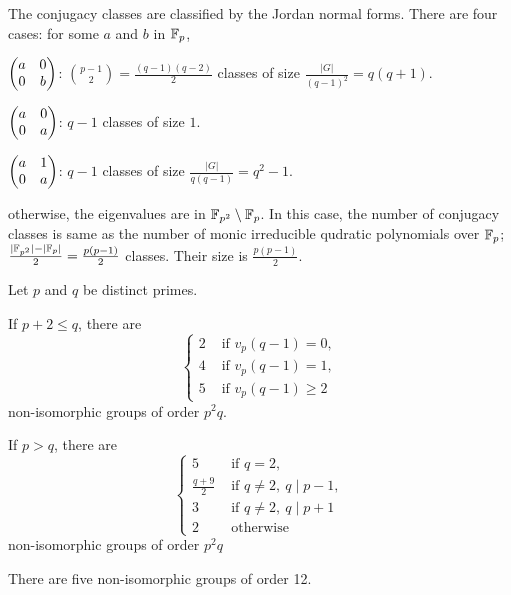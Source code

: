 \documentclass{../note}
\begin{document}
\begin{prb}
The conjugacy classes are classified by the Jordan normal forms.
There are four cases: for some $a$ and $b$ in $\mathbb{F}_p$,
\begin{parts}
\item $\begin{pmatrix}a&0\\0&b\end{pmatrix}$: $\binom{p-1}2=\frac{(q-1)(q-2)}2$ classes of size $\frac{|G|}{(q-1)^2}=q(q+1)$.
\item $\begin{pmatrix}a&0\\0&a\end{pmatrix}$: $q-1$ classes of size $1$.
\item $\begin{pmatrix}a&1\\0&a\end{pmatrix}$: $q-1$ classes of size $\frac{|G|}{q(q-1)}=q^2-1$.
\item otherwise, the eigenvalues are in $\mathbb{F}_{p^2}\setminus\mathbb{F}_p$.
In this case, the number of conjugacy classes is same as the number of monic irreducible qudratic polynomials over $\mathbb{F}_p$; $\frac{|\mathbb{F}_{p^2}|-|\mathbb{F}_p|}2=\frac{p(p-1)}2$ classes.
Their size is $\frac{p(p-1)}2$.
\end{parts}
\end{prb}
\begin{prb}
Let $p$ and $q$ be distinct primes.
\begin{parts}
\item If $p+2\le q$, there are
\[\begin{cases}
2&\text{ if }v_p(q-1)=0,\\
4&\text{ if }v_p(q-1)=1,\\
5&\text{ if }v_p(q-1)\ge2
\end{cases}\]
non-isomorphic groups of order $p^2q$.
\item If $p>q$, there are
\[\begin{cases}
5&\text{ if }q=2,\\
\frac{q+9}2&\text{ if }q\ne2,\ q\mid p-1,\\
3&\text{ if }q\ne2,\ q\mid p+1\\
2&\text{ otherwise }
\end{cases}\]
non-isomorphic groups of order $p^2q$
\item There are five non-isomorphic groups of order 12.
\end{parts}
\end{prb}
\end{document}
